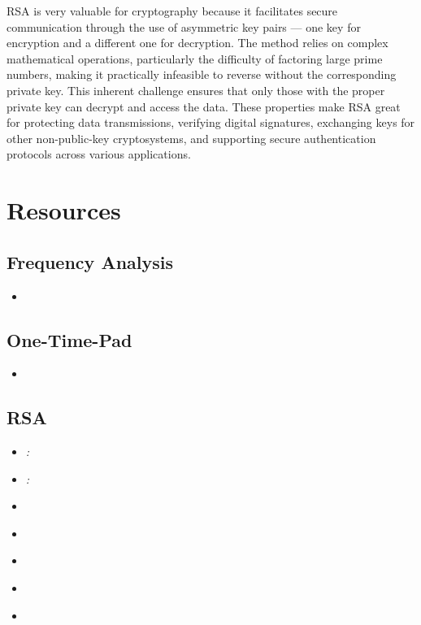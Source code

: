 \documentclass[11pt]{article}
\begin{document}
\begin{multicols}{2}
\begin{spacing}{1.125}
		RSA is very valuable for cryptography because it facilitates secure
		communication through the use of asymmetric key pairs — one key for
		encryption and a different one for decryption. The method relies on complex
		mathematical operations, particularly the difficulty of factoring large
		prime numbers, making it practically infeasible to reverse without the
		corresponding private key. This inherent challenge ensures that only those
		with the proper private key can decrypt and access the data. These
		properties make RSA great for protecting data transmissions, verifying
		digital signatures, exchanging keys for other non-public-key cryptosystems,
		and supporting secure authentication protocols across various applications.



		\section{Resources}
		\subsection{Frequency Analysis}
		\begin{itemize}
			\item {} \cite{101computing_frequency_analysis_2019}
		\end{itemize}
		\subsection{One-Time-Pad}
		\begin{itemize}
			\item {} \cite{rublon_onetime_password_vs_pad_2024}
		\end{itemize}
		\subsection{RSA}
		\begin{itemize}
			\item \textit{:} \cite{rfc4253}
			\item \textit{:}  \cite{rfc8017}
			\item {} \cite{wiki:ASN.1}
			\item {} \cite{wiki:X.690}
			\item {} \cite{wiki:PKCS_1}
			\item {} \cite{wiki:RSA_cryptosystem}
			\item {} \cite{rsa_encryption_brilliant}
		\end{itemize}



\end{spacing}
\end{multicols}
\end{document}
